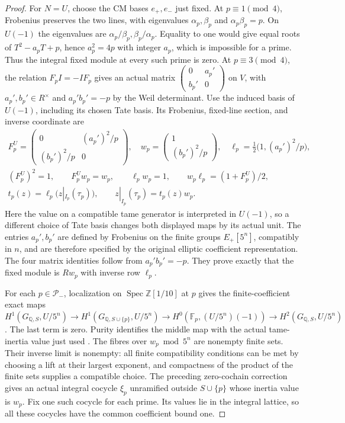 \begin{proof}
For $N=U$, choose the CM bases $e_+,e_-$ just fixed.
At $p\equiv1\pmod4$, Frobenius preserves the two lines,
with eigenvalues $\alpha_p,\beta_p$ and
$\alpha_p\beta_p=p$.  On $U(-1)$ the eigenvalues are
$\alpha_p/\beta_p,\beta_p/\alpha_p$.
Equality to one would give equal roots of
$T^2-a_pT+p$, hence $a_p^2=4p$ with integer $a_p$,
which is impossible for a prime.  Thus the integral fixed
module at every such prime is zero.
At $p\equiv3\pmod4$, the relation $F_pI=-IF_p$ gives
an actual matrix $\left(\begin{smallmatrix}0&a_p'\\b_p'&0\end{smallmatrix}\right)$
on $V$, with $a_p',b_p'\in R^\times$ and
$a_p'b_p'=-p$ by the Weil determinant.
Use the induced basis of $U(-1)$, including its chosen
Tate basis.  Its Frobenius, fixed-line section, and inverse
coordinate are
\[
 \begin{gathered}
 F_p^U=\begin{pmatrix}0&(a_p')^2/p\\(b_p')^2/p&0\end{pmatrix},
 \quad w_p=\begin{pmatrix}1\\(b_p')^2/p\end{pmatrix},
 \quad\ell_p=\tfrac12\bigl(1,(a_p')^2/p\bigr),\\
 (F_p^U)^2=1,\qquad F_p^Uw_p=w_p,\qquad
 \ell_pw_p=1,\qquad w_p\ell_p=(1+F_p^U)/2,\\
 t_p(z)=\ell_p\bigl(z|_{I_p}(\tau_p)\bigr),
 \qquad z|_{I_p}(\tau_p)=t_p(z)w_p.
 \end{gathered}
 \tag{E112.17}
\]
Here the value on a compatible tame generator is interpreted
in $U(-1)$, so a different choice of Tate basis changes
both displayed maps by its actual unit.  The entries
$a_p',b_p'$ are defined by Frobenius on the finite groups
$E_+[5^n]$, compatibly in $n$, and are therefore specified
by the original elliptic coefficient representation.
The four matrix identities follow from $a_p'b_p'=-p$.
They prove exactly that the fixed module is $Rw_p$ with
inverse row $\ell_p$.

For each $p\in\mathcal P_-$, localization on
$\operatorname{Spec}\mathbb Z[1/10]$ at $p$ gives the
finite-coefficient exact maps
$H^1(G_{\mathbb Q,S},U/5^n)\to
H^1(G_{\mathbb Q,S\cup\{p\}},U/5^n)\to
H^0(\mathbb F_p,(U/5^n)(-1))\to
H^2(G_{\mathbb Q,S},U/5^n)$.
The last term is zero.  Purity identifies the middle map
with the actual tame-inertia value just used
\cite[II.0.1(f), II.1.7(b), II.2.9]{E_MilneADT}.
The fibres over $w_p\bmod5^n$ are nonempty finite sets.
Their inverse limit is nonempty: all finite compatibility
conditions can be met by choosing a lift at their largest
exponent, and compactness of the product of the finite
sets supplies a compatible choice.
The preceding zero-cochain correction gives an actual
integral cocycle $\xi_p$ unramified outside $S\cup\{p\}$
whose inertia value is $w_p$.  Fix one such cocycle for
each prime.  Its values lie in the integral lattice, so
all these cocycles have the common coefficient bound one.


\end{proof}
